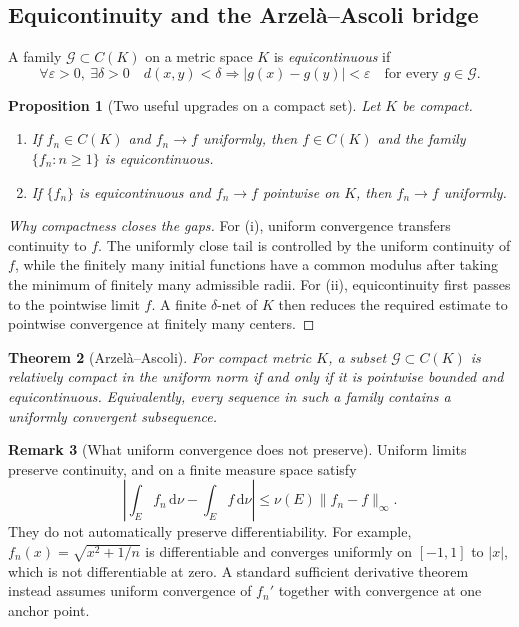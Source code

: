 \documentclass[10pt,a4paper]{article}
\numberwithin{equation}{section}
\theoremstyle{blueplain}
\newtheorem{theorem}{Theorem}[section]
\newtheorem{proposition}[theorem]{Proposition}
\theoremstyle{definition}
\newtheorem{remark}[theorem]{Remark}
\newcommand{\dd}{\,\mathrm d}
\begin{document}
\subsection{Equicontinuity and the Arzel\`a--Ascoli bridge}

A family \(\mathcal G\subset C(K)\) on a metric space \(K\) is
\emph{equicontinuous} if
\[
  \forall\varepsilon>0,\ \exists\delta>0
  \quad
  d(x,y)<\delta
  \Longrightarrow
  |g(x)-g(y)|<\varepsilon
  \quad\text{for every }g\in\mathcal G.
\]

\begin{proposition}[Two useful upgrades on a compact set]
Let \(K\) be compact.
\begin{enumerate}[label=(\roman*)]
  \item If \(f_n\in C(K)\) and \(f_n\to f\) uniformly, then
  \(f\in C(K)\) and the family \(\{f_n:n\ge1\}\) is equicontinuous.
  \item If \(\{f_n\}\) is equicontinuous and \(f_n\to f\) pointwise on \(K\),
  then \(f_n\to f\) uniformly.
\end{enumerate}
\end{proposition}

\begin{proof}[Why compactness closes the gaps]
For (i), uniform convergence transfers continuity to \(f\).  The uniformly
close tail is controlled by the uniform continuity of \(f\), while the
finitely many initial functions have a common modulus after taking the
minimum of finitely many admissible radii.  For (ii), equicontinuity first
passes to the pointwise limit \(f\).  A finite \(\delta\)-net of \(K\) then
reduces the required estimate to pointwise convergence at finitely many
centers.
\end{proof}

\begin{theorem}[Arzel\`a--Ascoli]
For compact metric \(K\), a subset \(\mathcal G\subset C(K)\) is relatively
compact in the uniform norm if and only if it is pointwise bounded and
equicontinuous.  Equivalently, every sequence in such a family contains a
uniformly convergent subsequence.
\end{theorem}

\begin{remark}[What uniform convergence does not preserve]
Uniform limits preserve continuity, and on a finite measure space satisfy
\[
  \left|\int_E f_n\dd\nu-\int_E f\dd\nu\right|
  \le \nu(E)\|f_n-f\|_\infty.
\]
They do not automatically preserve differentiability.  For example,
\(f_n(x)=\sqrt{x^2+1/n}\) is differentiable and converges uniformly on
\([-1,1]\) to \(|x|\), which is not differentiable at zero.  A standard
sufficient derivative theorem instead assumes uniform convergence of
\(f_n'\) together with convergence at one anchor point.
\end{remark}
\end{document}

